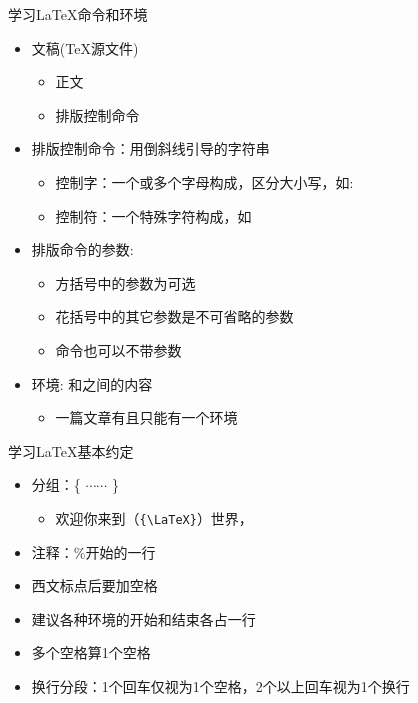 \documentclass[fontset = none, xcolor=svgnames, t, aspectratio=169]{ctexbeamer}
\begin{document}
\begin{frame}[t, fragile]{学习\LaTeX}{命令和环境}
  \stretchon
  \begin{itemize}
  \item 文稿({\TeX}源文件)
    \begin{itemize}
    \item 正文
    \item 排版控制命令
    \end{itemize}
  \item 排版控制命令：用\alert{倒斜线}引导的字符串
    \begin{itemize}
    \item 控制字：一个或多个字母构成，区分大小写，如:\texinline{\alpha}
    \item 控制符：一个特殊字符构成，如\texinline{\%}
    \end{itemize}
  \item 排版命令的参数:\\
    \fbox{%
      \textbackslash {\color{blue}{排版命令}}[{\color{green}{可选参
          数}}]$\left\{\text{\color{red}{其它参数}}\right\}$ }%
    \begin{itemize}
    \item 方括号中的参数为可选
    \item 花括号中的其它参数是不可省略的参数
    \item 命令也可以不带参数
    \end{itemize}
  \item 环境: \texinline{\begin{xxx}}和\texinline{\end{xxx}}之间的内容
    \begin{itemize}
      \item \alert{一篇文章有且只能有一个环境}
    \end{itemize}
  \end{itemize}
  \stretchoff
\end{frame}

\begin{frame}[t,fragile]{学习\LaTeX}{基本约定}
  \stretchon
  \begin{itemize}
  \item 分组：\{ $\cdots\cdots$ \}
    \begin{itemize}
    \item 欢迎你来到{\latex}（\verb|{\LaTeX}|）世界，
    \end{itemize}
  \item 注释：\%开始的一行
  \item 西文标点后要加空格
  \item 建议各种环境的开始和结束各占一行
  \item 多个空格算1个空格
  \item \alert{换行分段}：1个回车仅视为1个空格，2个以上回车视为1个换行
  \end{itemize}
  \stretchoff
\end{frame}
\end{document}
